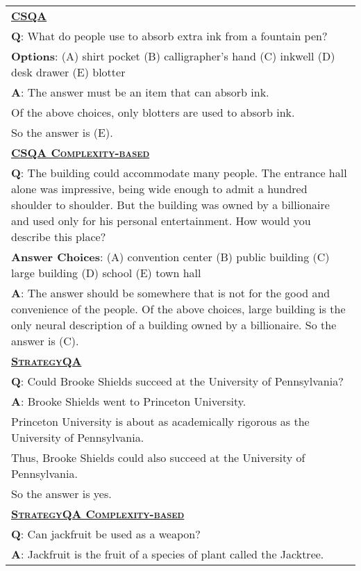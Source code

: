 \begin{table}[htbp]
    \centering
    \begin{tabular}{p{}}
        \toprule
        \underline{\textbf{\textsc{CSQA}}} \\
        \textbf{Q}: What do people use to absorb extra ink from a fountain pen?\\
        \textbf{Options}: (A) shirt pocket (B) calligrapher's hand (C) inkwell (D) desk drawer (E) blotter \\
        \textbf{A}: The answer must be an item that can absorb ink.\\
        Of the above choices, only blotters are used to absorb ink.\\
        So the answer is (E).\\
        \underline{\textbf{\textsc{CSQA Complexity-based}}} \\
        \textbf{Q}: The building could accommodate many people. The entrance hall alone was impressive, being wide enough to admit a hundred shoulder to shoulder. But the building was owned by a billionaire and used only for his personal entertainment.  How would you describe this place? \\
        \textbf{Answer Choices}: (A) convention center (B) public building (C) large building (D) school (E) town hall \\
        \textbf{A}: The answer should be somewhere that is not for the good and convenience of the people. 
Of the above choices, large building is the only neural description of a building owned by a billionaire. So the answer is (C).\\
        \midrule
        \underline{\textbf{\textsc{StrategyQA}}} \\
        \textbf{Q}: Could Brooke Shields succeed at the University of Pennsylvania?\\
        \textbf{A}: Brooke Shields went to Princeton University. \\ 
        Princeton University is about as academically rigorous as the University of Pennsylvania. \\
        Thus, Brooke Shields could also succeed at the University of Pennsylvania. \\ So the answer is yes. \\
        \underline{\textbf{\textsc{StrategyQA Complexity-based}}} \\
        \textbf{Q}: Can jackfruit be used as a weapon? \\
        \textbf{A}: Jackfruit is the fruit of a species of plant called the Jacktree. \\

\end{tabular}
\end{table}
